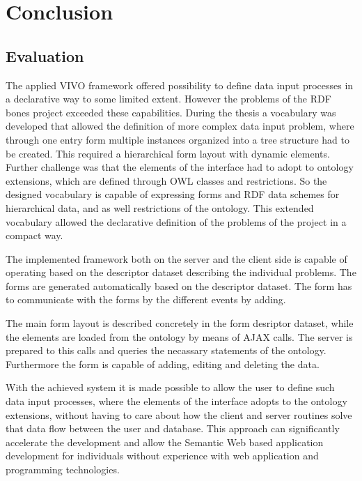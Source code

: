 

\chapter{Conclusion}

\section{Evaluation}

The applied VIVO framework offered possibility to define data input processes in a declarative way to some limited extent. However the problems of the RDF bones project exceeded these capabilities. During the thesis a vocabulary was developed that allowed the definition of more complex data input problem, where through one entry form multiple instances organized into a tree structure had to be created. This required a hierarchical form layout with dynamic elements. Further challenge was that the elements of the interface had to adopt to ontology extensions, which are defined through OWL classes and restrictions. So the designed vocabulary is capable of expressing forms and RDF data schemes for hierarchical data, and as well restrictions of the ontology. This extended vocabulary allowed the declarative definition of the problems of the project in a compact way. 

The implemented framework both on the server and the client side is capable of operating based on the descriptor dataset describing the individual problems. The forms are generated automatically based on the descriptor dataset. The form has to communicate with the forms by the different events by adding. 



The main form layout is described concretely in the form desriptor dataset, while the elements are loaded from the ontology by means of AJAX calls. The server is prepared to this calls and queries the necassary statements of the ontology. Furthermore the form is capable of adding, editing and deleting the data. 

With the achieved system it is made possible to allow the user to define such data input processes, where the elements of the interface adopts to the ontology extensions, without having to care about how the client and server routines solve that data flow between the user and database. This approach can significantly accelerate the development and allow the Semantic Web based application development for individuals without experience with web application and programming technologies.







